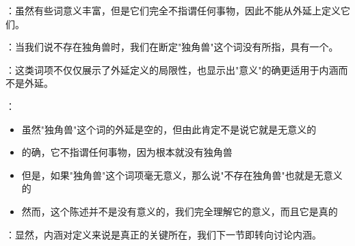 \begin{theorembox}[title=空外延词项的根本挑战]
：虽然有些词意义丰富，但是它们完全不指谓任何事物，因此不能从外延上定义它们。

：当我们说不存在独角兽时，我们在断定"独角兽"这个词没有所指，具有一个。
\end{theorembox}

\begin{theorembox}[title=空外延词项的理论意义]
：这类词项不仅仅展示了外延定义的局限性，也显示出"意义"的确更适用于内涵而不是外延。

：
\begin{itemize}
  \item 虽然"独角兽"这个词的外延是空的，但由此肯定不是说它就是无意义的
  \item 的确，它不指谓任何事物，因为根本就没有独角兽
  \item 但是，如果"独角兽"这个词项毫无意义，那么说"不存在独角兽"也就是无意义的
  \item 然而，这个陈述并不是没有意义的，我们完全理解它的意义，而且它是真的
\end{itemize}

：显然，内涵对定义来说是真正的关键所在，我们下一节即转向讨论内涵。
\end{theorembox}

